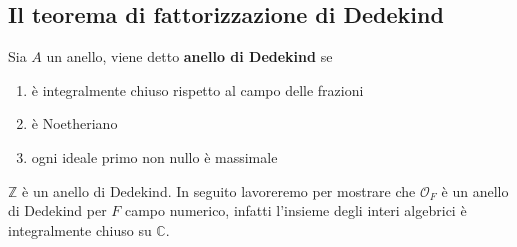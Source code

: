 \subsection{Il teorema di fattorizzazione di Dedekind}
\begin{definizione}
	Sia $A$ un anello, viene detto \textbf{anello di Dedekind} se
	\begin{enumerate}
		\item è integralmente chiuso rispetto al campo delle frazioni
		\item è Noetheriano
		\item ogni ideale primo non nullo è massimale
	\end{enumerate}
\end{definizione}

\begin{esempio}
	$\mathbb{Z}$ è un anello di Dedekind. 
	In seguito lavoreremo per mostrare che $\mathcal{O}_F$ è un anello di Dedekind per $F$ campo numerico, infatti l'insieme degli interi algebrici è integralmente chiuso su $\mathbb{C}$.
\end{esempio}

